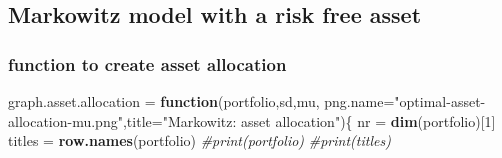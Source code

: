 \documentclass[]{article}
\newenvironment{Shaded}{\begin{snugshade}}{\end{snugshade}}
\newcommand{\KeywordTok}[1]{\textcolor[rgb]{0.13,0.29,0.53}{\textbf{#1}}}
\newcommand{\DataTypeTok}[1]{\textcolor[rgb]{0.13,0.29,0.53}{#1}}
\newcommand{\DecValTok}[1]{\textcolor[rgb]{0.00,0.00,0.81}{#1}}
\newcommand{\StringTok}[1]{\textcolor[rgb]{0.31,0.60,0.02}{#1}}
\newcommand{\CommentTok}[1]{\textcolor[rgb]{0.56,0.35,0.01}{\textit{#1}}}
\newcommand{\ControlFlowTok}[1]{\textcolor[rgb]{0.13,0.29,0.53}{\textbf{#1}}}
\newcommand{\NormalTok}[1]{#1}
\begin{document}
\subsection{Markowitz model with a risk free
asset}\label{markowitz-model-with-a-risk-free-asset}

\subsubsection{function to create asset
allocation}\label{function-to-create-asset-allocation}

\begin{Shaded}
\begin{Highlighting}[]
\NormalTok{graph.asset.allocation =}\StringTok{ }\ControlFlowTok{function}\NormalTok{(portfolio,sd,mu, }\DataTypeTok{png.name=}\StringTok{"optimal-asset-allocation-mu.png"}\NormalTok{,}\DataTypeTok{title=}\StringTok{"Markowitz: asset allocation"}\NormalTok{)\{}
\NormalTok{  nr =}\StringTok{ }\KeywordTok{dim}\NormalTok{(portfolio)[}\DecValTok{1}\NormalTok{]}
\NormalTok{  titles =}\StringTok{ }\KeywordTok{row.names}\NormalTok{(portfolio)}
  \CommentTok{#print(portfolio)}
  \CommentTok{#print(titles)}


\end{Highlighting}
\end{Shaded}
\end{document}
